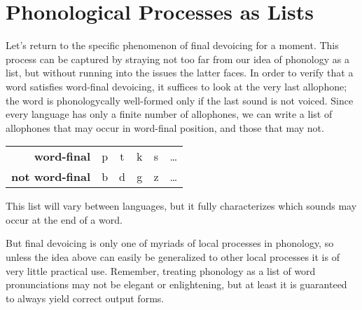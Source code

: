 \section{Phonological Processes as Lists}
Let's return to the specific phenomenon of final devoicing for a moment.
This process can be captured by straying not too far from our idea of phonology as a list, but without running into the issues the latter faces.
In order to verify that a word satisfies word-final devoicing, it suffices to look at the very last allophone;
the word is phonologycally well-formed only if the last sound is not voiced.
Since every language has only a finite number of allophones, we can write a list of allophones that may occur in word-final position, and those that may not.
%
\begin{center}
    \begin{tabular}{r@{\hskip 2em}ccccc}
        \textbf{word-final}     & p & t & k & s & \ldots\\
        \textbf{not word-final} & b & d & g & z & \ldots
    \end{tabular}
\end{center}
%
This list will vary between languages, but it fully characterizes which sounds may occur at the end of a word.

But final devoicing is only one of myriads of local processes in phonology, so unless the idea above can easily be generalized to other local processes it is of very little practical use.
Remember, treating phonology as a list of word pronunciations may not be elegant or enlightening, but at least it is guaranteed to always yield correct output forms.

